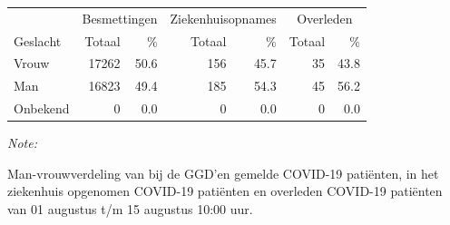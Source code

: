 \documentclass[
  english,
  man,floatsintext]{apa6}
\begin{document}
\begin{table}
\centering\begingroup\fontsize{11}{13}\selectfont

\begin{threeparttable}
\begin{tabular}{lrrrrrr}
\toprule
\multicolumn{1}{c}{ } & \multicolumn{2}{c}{Besmettingen} & \multicolumn{2}{c}{Ziekenhuisopnames} & \multicolumn{2}{c}{Overleden} \\
\cmidrule(l{3pt}r{3pt}){2-3} \cmidrule(l{3pt}r{3pt}){4-5} \cmidrule(l{3pt}r{3pt}){6-7}
Geslacht & Totaal & \% & Totaal & \% & Totaal & \%\\
\midrule
Vrouw & 17262 & 50.6 & 156 & 45.7 & 35 & 43.8\\
Man & 16823 & 49.4 & 185 & 54.3 & 45 & 56.2\\
Onbekend & 0 & 0.0 & 0 & 0.0 & 0 & 0.0\\
\bottomrule
\end{tabular}
\begin{tablenotes}
\item \textit{Note: } 
\item Man-vrouwverdeling van bij de GGD’en gemelde COVID-19 patiënten, in het ziekenhuis opgenomen COVID-19 patiënten en overleden COVID-19 patiënten van 01 augustus t/m 15 augustus 10:00 uur.
\end{tablenotes}
\end{threeparttable}
\endgroup{}
\end{table}
\newpage
\end{document}

